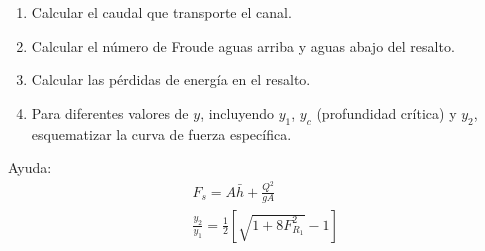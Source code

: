 \documentclass[10pt, letterpaper]{exam}
\begin{document}
\begin{enumerate}
    \item Calcular el caudal que transporte el canal.
    \item Calcular el n\'umero de Froude aguas arriba y aguas abajo del resalto.
    \item Calcular las p\'erdidas de energ\'ia en el resalto.
    \item Para diferentes valores de $y$, incluyendo $y_1$, $y_c$ (profundidad cr\'itica) y $y_2$, esquematizar la curva de fuerza espec\'ifica.
\end{enumerate}

Ayuda:
\vspace{-0.5cm}
\begin{equation*} 
\begin{split}
& F_s = A \bar{h} + \frac{Q^2}{gA} \\
& \frac{y_2}{y_1} = \frac{1}{2}\left[ \sqrt{1+8F_{R_1}^2 } -1 \right]
\end{split}
\end{equation*}



\end{document}
